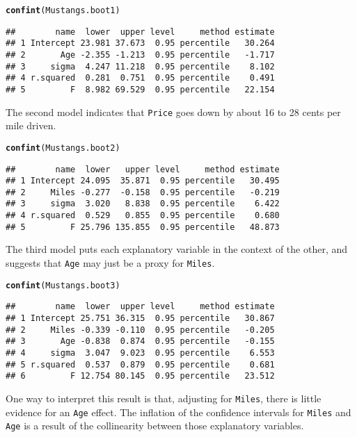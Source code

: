 \documentclass[11pt]{article}\usepackage[]{graphicx}\usepackage[]{color}
\makeatletter
\newcommand{\hlstd}[1]{\textcolor[rgb]{0.345,0.345,0.345}{#1}}%
\newcommand{\hlkwd}[1]{\textcolor[rgb]{0.737,0.353,0.396}{\textbf{#1}}}%
\newenvironment{kframe}{%
 \def\at@end@of@kframe{}%
 \ifinner\ifhmode%
  \def\at@end@of@kframe{\end{minipage}}%
  \begin{minipage}{\columnwidth}%
 \fi\fi%
 \def\FrameCommand##1{\hskip\@totalleftmargin \hskip-\fboxsep
 \colorbox{shadecolor}{##1}\hskip-\fboxsep
     \hskip-\linewidth \hskip-\@totalleftmargin \hskip\columnwidth}%
 \MakeFramed {\advance\hsize-\width
   \@totalleftmargin\z@ \linewidth\hsize
   \@setminipage}}%
 {\par\unskip\endMakeFramed%
 \at@end@of@kframe}
\newenvironment{knitrout}{}{} %
\makeatother
\begin{document}
\begin{knitrout}
\color{fgcolor}\begin{kframe}
\begin{alltt}
\hlkwd{confint}\hlstd{(Mustangs.boot1)}
\end{alltt}
\begin{verbatim}
##        name  lower  upper level     method estimate
## 1 Intercept 23.981 37.673  0.95 percentile   30.264
## 2       Age -2.355 -1.213  0.95 percentile   -1.717
## 3     sigma  4.247 11.218  0.95 percentile    8.102
## 4 r.squared  0.281  0.751  0.95 percentile    0.491
## 5         F  8.982 69.529  0.95 percentile   22.154
\end{verbatim}
\end{kframe}
\end{knitrout}
The second model indicates that \texttt{Price} goes down by about 16 to 28 cents per mile driven.
\begin{knitrout}
\color{fgcolor}\begin{kframe}
\begin{alltt}
\hlkwd{confint}\hlstd{(Mustangs.boot2)}
\end{alltt}
\begin{verbatim}
##        name  lower   upper level     method estimate
## 1 Intercept 24.095  35.871  0.95 percentile   30.495
## 2     Miles -0.277  -0.158  0.95 percentile   -0.219
## 3     sigma  3.020   8.838  0.95 percentile    6.422
## 4 r.squared  0.529   0.855  0.95 percentile    0.680
## 5         F 25.796 135.855  0.95 percentile   48.873
\end{verbatim}
\end{kframe}
\end{knitrout}

The third model puts each explanatory variable in the context of the other, and suggests that \texttt{Age} may just be a proxy for \texttt{Miles}.
\begin{knitrout}
\color{fgcolor}\begin{kframe}
\begin{alltt}
\hlkwd{confint}\hlstd{(Mustangs.boot3)}
\end{alltt}
\begin{verbatim}
##        name  lower  upper level     method estimate
## 1 Intercept 25.751 36.315  0.95 percentile   30.867
## 2     Miles -0.339 -0.110  0.95 percentile   -0.205
## 3       Age -0.838  0.874  0.95 percentile   -0.155
## 4     sigma  3.047  9.023  0.95 percentile    6.553
## 5 r.squared  0.537  0.879  0.95 percentile    0.681
## 6         F 12.754 80.145  0.95 percentile   23.512
\end{verbatim}
\end{kframe}
\end{knitrout}
One way to interpret this result is that, adjusting for \texttt{Miles}, 
there is little 
evidence for an \texttt{Age} effect.  The inflation of the confidence intervals for 
\texttt{Miles} and \texttt{Age} is a result of the collinearity 
between those explanatory variables. 
\end{document}
